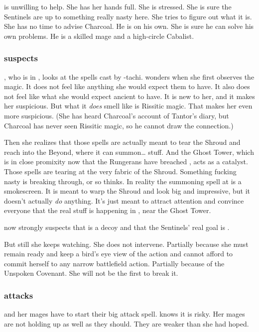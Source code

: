 \Achsah is unwilling to help. 
She has her hands full. 
She is stressed. 
She is sure the Sentinels are up to something really nasty here.
She tries to figure out what it is. 
She has no time to advise Charcoal. 
He is on his own.
She is sure he can solve his own problems. 
He is a skilled mage and a high-circle Cabalist. 





\subsubsection{\Achsah suspects \Takestsha}
\Achsah, who is in \Forclin, looks at the \quo{\EreshKali} spells cast by \Takestsha-tachi. 
\Achsah{} wonders when she first observes the \EreshKali{} magic. 
It does not feel like anything she would expect them to have. 
It also does not feel like what she would expect ancient \meccara{} to have. 
It is new to her, and it makes her suspicious. 
But what it \emph{does} smell like is Rissitic magic. 
That makes her even more suspicious. 
(She has heard Charcoal's account of Tantor's diary, but Charcoal has never seen Rissitic magic, so he cannot draw the connection.) 

Then she realizes that those spells are actually meant to tear the Shroud and reach into the Beyond, where it can summon\ldots{} stuff. 
And the Ghost Tower, which is in close promixity now that the Rungerans have breached \Forclin, acts as a catalyst. 
Those spells are tearing at the very fabric of the Shroud. 
Something fucking nasty is breaking through, or so \Achsah thinks. 
In reality the summoning spell at \Forclin is a smokescreen. 
It is meant to warp the Shroud and look big and impressive, but it doesn't actually \emph{do} anything. 
It's just meant to attract attention and convince everyone that the real stuff is happening in \Forclin, near the Ghost Tower. 

\Achsah now strongly suspects that \Malcur is a decoy and that the Sentinels' real goal is \Forclin. 

But still she keeps watching.
She does not intervene. 
Partially because she must remain ready and keep a bird's eye view of the action and cannot afford to commit herself to any narrow battlefield action.
Partially because of the Unspoken Covenant.
She will not be the first to break it. 





\subsubsection{\Takestsha attacks}
\Takestsha and her mages have to start their big attack spell. 
\Takestsha knows it is risky. 
Her mages are not holding up as well as they should. 
They are weaker than she had hoped. 

